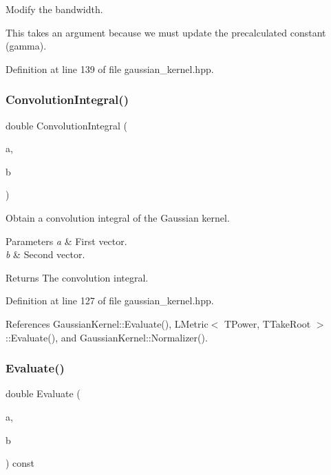 Modify the bandwidth. 

This takes an argument because we must update the precalculated constant (gamma). 

Definition at line 139 of file gaussian\+\_\+kernel.\+hpp.

\mbox{\label{classmlpack_1_1kernel_1_1GaussianKernel_af3077f924263d1932950f4f7176c93eb}} 
\subsubsection{Convolution\+Integral()}
{\footnotesize\ttfamily double Convolution\+Integral (\begin{DoxyParamCaption}\item[{const Vec\+TypeA \&}]{a,  }\item[{const Vec\+TypeB \&}]{b }\end{DoxyParamCaption})\hspace{0.3cm}{\ttfamily [inline]}}



Obtain a convolution integral of the Gaussian kernel. 


\begin{DoxyParams}{Parameters}
{\em a} & First vector. \\
\hline
{\em b} & Second vector. \\
\hline
\end{DoxyParams}
\begin{DoxyReturn}{Returns}
The convolution integral. 
\end{DoxyReturn}


Definition at line 127 of file gaussian\+\_\+kernel.\+hpp.



References Gaussian\+Kernel\+::\+Evaluate(), L\+Metric$<$ T\+Power, T\+Take\+Root $>$\+::\+Evaluate(), and Gaussian\+Kernel\+::\+Normalizer().

\mbox{\label{classmlpack_1_1kernel_1_1GaussianKernel_a84c3aeba25ea7703bd2d4f85a54301da}} 
\subsubsection{Evaluate()\hspace{0.1cm}{\footnotesize\ttfamily [1/2]}}
{\footnotesize\ttfamily double Evaluate (\begin{DoxyParamCaption}\item[{const Vec\+TypeA \&}]{a,  }\item[{const Vec\+TypeB \&}]{b }\end{DoxyParamCaption}) const\hspace{0.3cm}{\ttfamily [inline]}}



